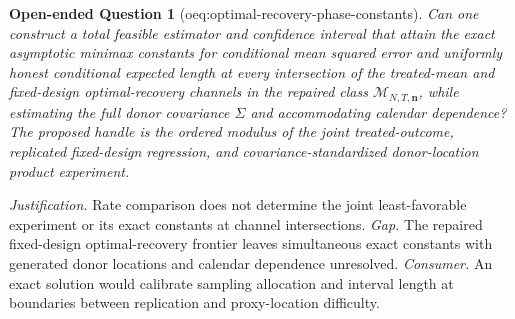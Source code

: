 \documentclass{article}
\newtheorem{openendedquestion}{Open-ended Question}
\begin{document}
\begin{openendedquestion}[oeq:optimal-recovery-phase-constants]\label{oeq:optimal-recovery-phase-constants}
Can one construct a total feasible estimator and confidence interval that attain the exact asymptotic minimax constants for conditional mean squared error and uniformly honest conditional expected length at every intersection of the treated-mean and fixed-design optimal-recovery channels in the repaired class \(\mathcal M_{N,T,\mathbf n}\), while estimating the full donor covariance \(\Sigma\) and accommodating calendar dependence?  The proposed handle is the ordered modulus of the joint treated-outcome, replicated fixed-design regression, and covariance-standardized donor-location product experiment.
\end{openendedquestion}
\par\smallskip\noindent \textit{Justification.} Rate comparison does not determine the joint least-favorable experiment or its exact constants at channel intersections. \textit{Gap.} The repaired fixed-design optimal-recovery frontier leaves simultaneous exact constants with generated donor locations and calendar dependence unresolved. \textit{Consumer.} An exact solution would calibrate sampling allocation and interval length at boundaries between replication and proxy-location difficulty.
\end{document}
